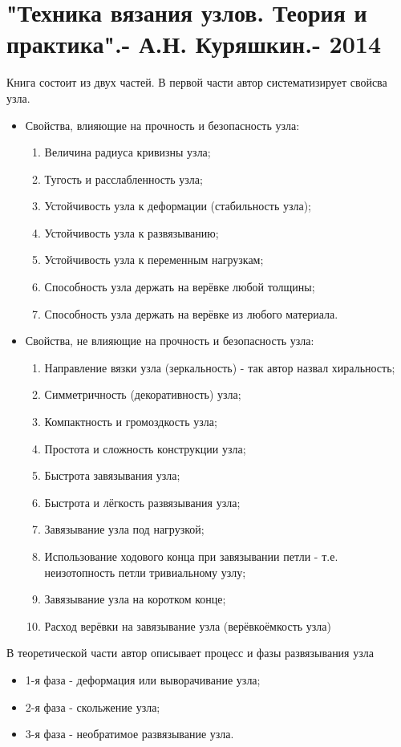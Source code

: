 \section{"Техника вязания узлов. Теория и практика".- А.Н. Куряшкин.- 2014}

Книга состоит из двух частей. В первой части автор систематизирует свойсва узла.

\begin{itemize}
\item Свойства, влияющие на прочность и безопасность узла:
\begin{enumerate}
\item Величина радиуса кривизны узла;
\item Тугость и расслабленность узла;
\item Устойчивость узла к деформации (стабильность узла);
\item Устойчивость узла к развязыванию;
\item Устойчивость узла к переменным нагрузкам;
\item Способность узла держать на верёвке любой толщины;
\item Способность узла держать на верёвке из любого материала.
\end{enumerate}
\item Свойства, не влияющие на прочность и безопасность узла:
\begin{enumerate}
\item Направление вязки узла (зеркальность) - так автор назвал хиральность;
\item Симметричность (декоративность) узла;
\item Компактность и громоздкость узла;
\item Простота и сложность конструкции узла;
\item Быстрота завязывания узла;
\item Быстрота и лёгкость развязывания узла;
\item Завязывание узла под нагрузкой;
\item Использование ходового конца при завязывании петли - т.е. неизотопность петли тривиальному узлу;
\item Завязывание узла на коротком конце;
\item Расход верёвки на завязывание узла (верёвкоёмкость узла)
\end{enumerate}
\end{itemize}

В теоретической части автор описывает процесс и фазы развязывания узла
\begin{itemize}
\item 1-я фаза - деформация или выворачивание узла;
\item 2-я фаза - скольжение узла;
\item 3-я фаза - необратимое развязывание узла.
\end{itemize}


